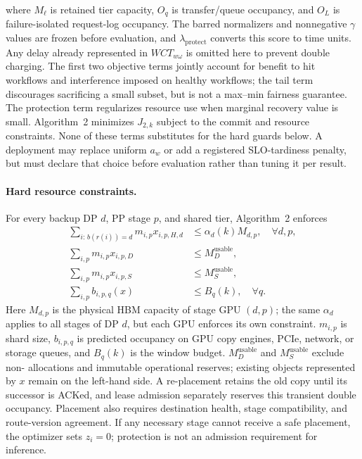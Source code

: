 where $M_\ell$ is retained tier capacity, $O_q$ is transfer/queue occupancy,
and $O_L$ is failure-isolated request-log occupancy.  The barred normalizers
and nonnegative $\gamma$ values are frozen before evaluation, and
$\lambda_{\mathrm{protect}}$ converts this score to time units.  Any delay
already represented in $WCT_{w\omega}$ is omitted here to prevent double
charging.  The first two objective terms jointly account for benefit to hit
workflows and interference imposed on healthy workflows; the tail term
discourages sacrificing a small subset, but is not a max--min fairness
guarantee.  The protection term regularizes resource use when marginal
recovery value is small.  Algorithm~2 minimizes $J_{2,k}$ subject to the commit
and resource constraints.  None of these terms substitutes for the hard guards
below.  A deployment may replace uniform $a_w$ or add a registered
SLO-tardiness penalty, but must declare that choice before evaluation rather
than tuning it per result.

\paragraph{Hard resource constraints.}
For every backup DP $d$, PP stage $p$, and shared tier, Algorithm~2 enforces
\begin{align}
  \sum_{i:\,b(r(i))=d}m_{i,p}x_{i,p,H,d}
    &\le \alpha_d(k)M_{d,p},\quad\forall d,p,
    \label{eq:hbm-capacity}\\
  \sum_{i,p}m_{i,p}x_{i,p,D} &\le M_D^{\mathrm{usable}}, \label{eq:dram-capacity}\\
  \sum_{i,p}m_{i,p}x_{i,p,S} &\le M_S^{\mathrm{usable}}, \label{eq:ssd-capacity}\\
  \sum_{i,p} b_{i,p,q}(x)
    &\le B_q(k),\quad \forall q.
  \label{eq:bandwidth}
\end{align}
Here $M_{d,p}$ is the physical HBM capacity of stage GPU $(d,p)$; the same
$\alpha_d$ applies to all stages of DP $d$, but each GPU enforces its own
constraint.  $m_{i,p}$ is shard size, $b_{i,p,q}$ is predicted occupancy on GPU
copy engines, PCIe, network, or storage queues, and $B_q(k)$ is the window
budget.  $M_D^{\mathrm{usable}}$ and $M_S^{\mathrm{usable}}$ exclude
non-\system{} allocations and immutable operational reserves; existing
\system{} objects represented by $x$ remain on the left-hand side.  A
re-placement retains the old copy until its successor is ACKed, and lease
admission separately reserves this transient double occupancy.  Placement also requires
destination health, stage compatibility, and route-version agreement.  If any
necessary stage cannot receive a safe placement, the optimizer sets $z_i=0$;
protection is not an admission requirement for inference.

